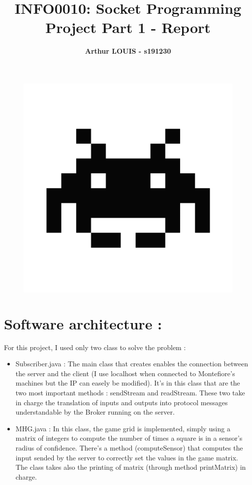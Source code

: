 \documentclass{article}
\begin{document}

\title{\Large{INFO0010: Socket Programming Project Part 1 - Report}}
\vspace{1cm}
\author{\small{\bf Arthur LOUIS - s191230}}

\maketitle

\begin{figure}[!h]
    \centering
    \includegraphics[scale = 0.15]{pngegg.png}
\end{figure}

\section{Software architecture :}
For this project, I used only two class to solve the problem :
\begin{itemize}
    \item Subscriber.java : The main class that creates enables the connection between 
    the server and the client (I use localhost when connected to Montefiore's machines but the IP can easely be modified).
    It's in this class that are the two most important methods : sendStream and readStream. These two take in charge the translation of inputs 
    and outputs into protocol messages understandable by the Broker running on the server.
    \item MHG.java : In this class, the game grid is implemented, simply using a matrix of integers to compute the number of times a square is in 
    a sensor's radius of confidence. There's a method (computeSensor) that computes the input sended by the server to correctly set the values in 
    the game matrix. The class takes also the printing of matrix (through method printMatrix) in charge.
\end{itemize}
\end{document}
